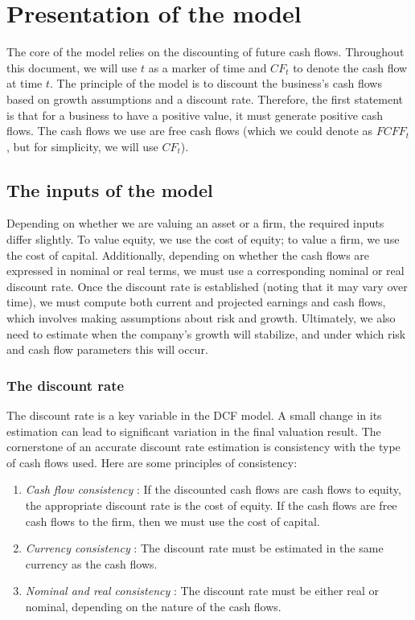 \chapter{Presentation of the model}

The core of the model relies on the discounting of future cash flows. Throughout this document, we will use $t$ as a marker of time and $CF_t$ to denote the cash flow at time $t$. The principle of the model is to discount the business’s cash flows based on growth assumptions and a discount rate. Therefore, the first statement is that for a business to have a positive value, it must generate positive cash flows. The cash flows we use are free cash flows (which we could denote as $FCFF_t$, but for simplicity, we will use $CF_t$).

\section{The inputs of the model}

Depending on whether we are valuing an asset or a firm, the required inputs differ slightly. To value equity, we use the cost of equity; to value a firm, we use the cost of capital. Additionally, depending on whether the cash flows are expressed in nominal or real terms, we must use a corresponding nominal or real discount rate. Once the discount rate is established (noting that it may vary over time), we must compute both current and projected earnings and cash flows, which involves making assumptions about risk and growth. Ultimately, we also need to estimate when the company’s growth will stabilize, and under which risk and cash flow parameters this will occur.

\subsection{The discount rate}

The discount rate is a key variable in the DCF model. A small change in its estimation can lead to significant variation in the final valuation result. The cornerstone of an accurate discount rate estimation is consistency with the type of cash flows used. Here are some principles of consistency:

\begin{enumerate}[label=(\alph*)]
    \item \textit{Cash flow consistency} : If the discounted cash flows are cash flows to equity, the appropriate discount rate is the cost of equity. If the cash flows are free cash flows to the firm, then we must use the cost of capital.

    \item \textit{Currency consistency} : The discount rate must be estimated in the same currency as the cash flows.

    \item  \textit{Nominal and real consistency} : The discount rate must be either real or nominal, depending on the nature of the cash flows.
\end{enumerate}

